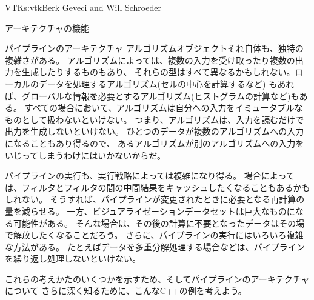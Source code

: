 \begin{aosachapter}{VTK}{s:vtk}{Berk Geveci and Will Schroeder}
\begin{aosasect1}{アーキテクチャの機能}
\begin{aosasect2}{パイプラインのアーキテクチャ}
アルゴリズムオブジェクトそれ自体も、独特の複雑さがある。
アルゴリズムによっては、複数の入力を受け取ったり複数の出力を生成したりするものもあり、
それらの型はすべて異なるかもしれない。ローカルのデータを処理するアルゴリズム(セルの中心を計算するなど)
もあれば、グローバルな情報を必要とするアルゴリズム(ヒストグラムの計算など)もある。
すべての場合において、アルゴリズムは自分への入力をイミュータブルなものとして扱わないといけない。
つまり、アルゴリズムは、入力を読むだけで出力を生成しないといけない。
ひとつのデータが複数のアルゴリズムへの入力になることもあり得るので、
あるアルゴリズムが別のアルゴリズムへの入力をいじってしまうわけにはいかないからだ。

パイプラインの実行も、実行戦略によっては複雑になり得る。
場合によっては、フィルタとフィルタの間の中間結果をキャッシュしたくなることもあるかもしれない。
そうすれば、パイプラインが変更されたときに必要となる再計算の量を減らせる。
一方、ビジュアライゼーションデータセットは巨大なものになる可能性がある。
そんな場合は、その後の計算に不要となったデータはその場で解放したくなることだろう。
さらに、パイプラインの実行にはいろいろ複雑な方法がある。
たとえばデータを多重分解処理する場合などは、パイプラインを繰り返し処理しないといけない。

これらの考えかたのいくつかを示すため、そしてパイプラインのアーキテクチャについて
さらに深く知るために、こんなC++の例を考えよう。


\end{aosasect2}
\end{aosasect1}
\end{aosachapter}
